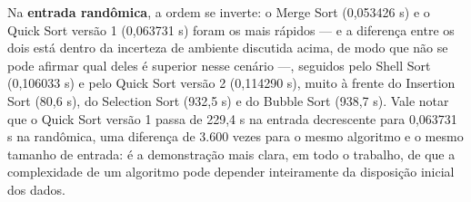 \qquad Na \textbf{entrada randômica}, a ordem se inverte: o Merge Sort
(0,053426 s) e o Quick Sort versão 1 (0,063731 s) foram os mais
rápidos --- e a diferença entre os dois está dentro da incerteza de
ambiente discutida acima, de modo que não se pode afirmar qual deles é
superior nesse cenário ---, seguidos pelo Shell Sort (0,106033 s) e
pelo Quick Sort versão 2 (0,114290 s), muito à frente do Insertion
Sort (80,6 s), do Selection Sort (932,5 s) e do Bubble Sort
(938,7 s). Vale notar que o Quick Sort versão 1 passa de 229,4 s na
entrada decrescente para 0,063731 s na randômica, uma diferença de
3.600 vezes para o mesmo algoritmo e o mesmo tamanho de entrada: é a
demonstração mais clara, em todo o trabalho, de que a complexidade de
um algoritmo pode depender inteiramente da disposição inicial dos
dados.
